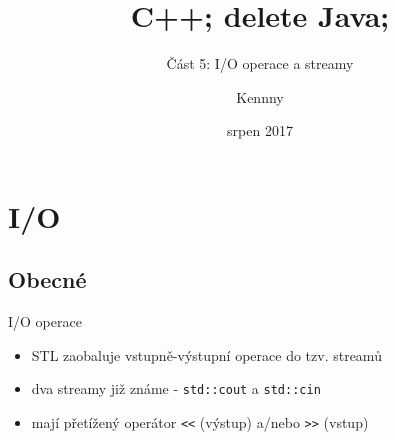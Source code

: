 \documentclass{beamer}
\begin{document}
\title{C++; delete Java;}
\subtitle{Část 5: I/O operace a streamy}
\author{Kennny}
\date{srpen 2017}

\frame{\titlepage}


\newenvironment{xframe}[1][]
  {\begin{frame}[fragile,environment=xframe,#1]}
  {\end{frame}}

\begin{comment}
\begin{xframe}{tttt}
	\begin{itemize}
		\item
	\end{itemize}
\end{xframe}
\end{comment}



\section{I/O}
\subsection{Obecné}


\begin{xframe}{I/O operace}
	\begin{itemize}
		\item STL zaobaluje vstupně-výstupní operace do tzv. streamů
		\item dva streamy již známe - \texttt{std::cout} a \texttt{std::cin}
		\item mají přetížený operátor \texttt{<<} (výstup) a/nebo \texttt{>>} (vstup)
	\end{itemize}
\end{xframe}
\end{document}
